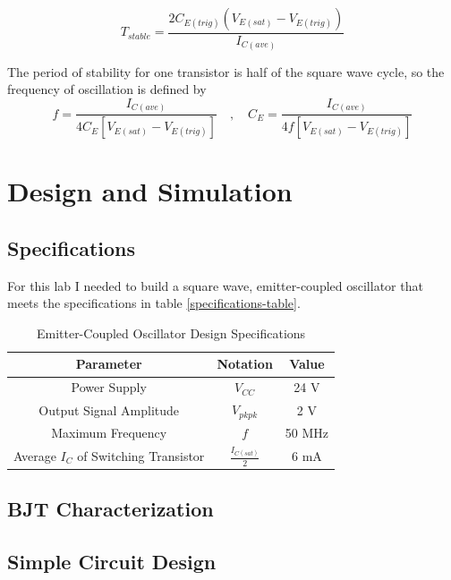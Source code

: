 \documentclass[titlepage, letterpaper, 10.5pt]{article}
\begin{document}
\begin{equation}
T_{stable}=\frac{2C_{E(trig)}(V_{E(sat)}-V_{E(trig)})}{I_{C(ave)}}
\end{equation}

The period of stability for one transistor is half of the square wave cycle,
so the frequency of oscillation is defined by
\begin{equation}
f=\frac{I_{C(ave)}}{4C_{E}[V_{E(sat)}-V_{E(trig)}]}
\quad, \quad
C_{E}=\frac{I_{C(ave)}}{4f[V_{E(sat)}-V_{E(trig)}]}
\end{equation}

\section{Design and Simulation}

\subsection{Specifications}

For this lab I needed to build a square wave, emitter-coupled oscillator
that meets the specifications in table \ref{specifications-table}.

\begin{table}[ht]
\centering
\caption{Emitter-Coupled Oscillator Design Specifications}
\begin{tabular}{c c c}
\hline\hline
Parameter	&Notation	&Value	\\
\hline\hline
Power Supply	&$V_{CC}$	&24 V	\\
Output Signal Amplitude	&$V_{pkpk}$	&2 V	\\
Maximum Frequency	&$f$	&50 MHz	\\
Average $I_{C}$ of Switching Transistor	&$\frac{I_{C(sat)}}{2}$	&6 mA	\\
\hline\hline
\end{tabular}
\label{specs-table}
\end{table}

\subsection{BJT Characterization}

\subsection{Simple Circuit Design}
\end{document}
